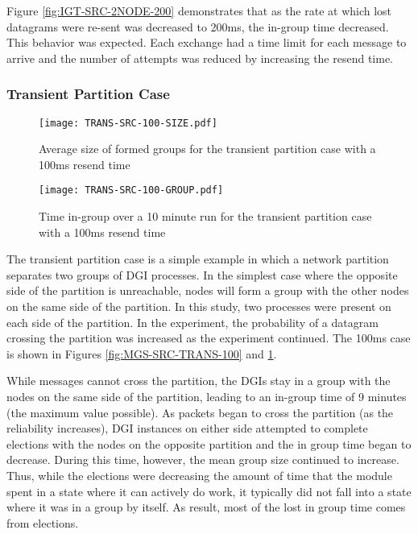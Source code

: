 Figure \ref{fig:IGT-SRC-2NODE-200} demonstrates that as the rate at which lost datagrams were re-sent was decreased to 200ms, the in-group time decreased.
This behavior was expected.
Each exchange had a time limit for each message to arrive and the number of attempts was reduced by increasing the resend time.

\subsubsection{Transient Partition Case}

\begin{figure}
\centering
\begin{minipage}{0.45\textwidth}
    \centering
    \texttt{[image: TRANS-SRC-100-SIZE.pdf]}
    \caption{Average size of formed groups for the transient partition case with a 100ms resend time}
    \label{fig:MGS-SRC-TRANS-100}
\end{minipage}%
\qquad
\begin{minipage}{0.45\textwidth}
    \centering
    \texttt{[image: TRANS-SRC-100-GROUP.pdf]}
    \caption{Time in-group over a 10 minute run for the transient partition case with a 100ms resend time}
    \label{fig:IGT-SRC-TRANS-100}
\end{minipage}
\end{figure}

The transient partition case is a simple example in which a network partition separates two groups of DGI processes. In the simplest case where the opposite side of the partition is unreachable, nodes will form a group with the other nodes on the same side of the partition.
In this study, two processes were present on each side of the partition.
In the experiment, the probability of a datagram crossing the partition was increased as the experiment continued.
The 100ms case is shown in Figures \ref{fig:MGS-SRC-TRANS-100} and \ref{fig:IGT-SRC-TRANS-100}.

While messages cannot cross the partition, the DGIs stay in a group with the nodes on the same side of the partition, leading to an in-group time of 9 minutes (the maximum value possible).
As packets began to cross the partition (as the reliability increases), DGI instances on either side attempted to complete elections with the nodes on the opposite partition and the in group time began to decrease.
During this time, however, the mean group size continued to increase.
Thus, while the elections were decreasing the amount of time that the module spent in a state where it can actively do work, it typically did not fall into a state where it was in a group by itself. 
As result, most of the lost in group time comes from elections.

